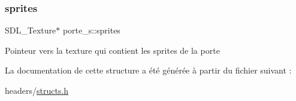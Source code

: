 \subsubsection{\texorpdfstring{sprites}{sprites}}
{\footnotesize\ttfamily S\+D\+L\+\_\+\+Texture$\ast$ porte\+\_\+s\+::sprites}

Pointeur vers la texture qui contient les sprites de la porte 

La documentation de cette structure a été générée à partir du fichier suivant \+:\begin{DoxyCompactItemize}
\item 
headers/\hyperlink{structs_8h}{structs.\+h}\end{DoxyCompactItemize}
